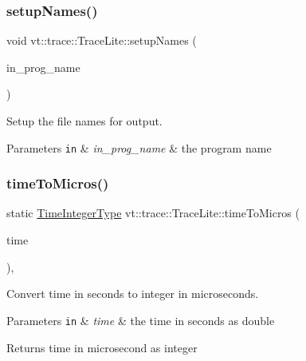\subsubsection{\texorpdfstring{setup\+Names()}{setupNames()}}
{\footnotesize\ttfamily void vt\+::trace\+::\+Trace\+Lite\+::setup\+Names (\begin{DoxyParamCaption}\item[{std\+::string const \&}]{in\+\_\+prog\+\_\+name }\end{DoxyParamCaption})}



Setup the file names for output. 


\begin{DoxyParams}[1]{Parameters}
\mbox{\tt in}  & {\em in\+\_\+prog\+\_\+name} & the program name \\
\hline
\end{DoxyParams}
\mbox{\label{structvt_1_1trace_1_1_trace_lite_a89d749168b5517b592b0603c594e6fdf}} 
\subsubsection{\texorpdfstring{time\+To\+Micros()}{timeToMicros()}}
{\footnotesize\ttfamily static \hyperlink{structvt_1_1trace_1_1_trace_lite_a301955b0e2e8d76ca5974c10be8125c4}{Time\+Integer\+Type} vt\+::trace\+::\+Trace\+Lite\+::time\+To\+Micros (\begin{DoxyParamCaption}\item[{\hyperlink{namespacevt_a2b9f28078dc309ad0706b69ded743e69}{Time\+Type} const}]{time }\end{DoxyParamCaption})\hspace{0.3cm}{\ttfamily [inline]}, {\ttfamily [static]}}



Convert time in seconds to integer in microseconds. 


\begin{DoxyParams}[1]{Parameters}
\mbox{\tt in}  & {\em time} & the time in seconds as double\\
\hline
\end{DoxyParams}
\begin{DoxyReturn}{Returns}
time in microsecond as integer 
\end{DoxyReturn}
\mbox{\label{structvt_1_1trace_1_1_trace_lite_aaf2192758f67bc57ab66766523bd96ad}} 
